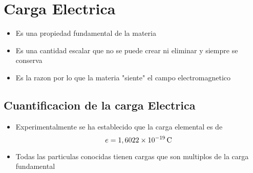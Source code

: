 \section{Carga Electrica}
\begin{itemize}
    \item Es una propiedad fundamental de la materia
    \item Es una cantidad escalar que no se puede crear ni eliminar y siempre se conserva
    \item Es la razon por lo que la materia "siente" el campo electromagnetico 
\end{itemize}
\subsection{Cuantificacion de la carga Electrica}
\begin{itemize}
    \item Experimentalmente se ha establecido que la carga elemental es de
    \begin{equation}
        e= 1,6022\times10^{-19} \, \rm{C}
    \end{equation} 
    \item Todas las particulas conocidas tienen cargas que son multiplos de la carga fundamental
\end{itemize}
